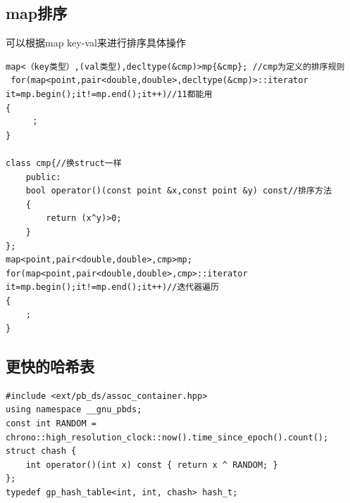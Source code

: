 \documentclass[12pt, a4paper, oneside]{ctexart}
\begin{document}
\newpage 
\subsection{map排序} 
可以根据map key-val来进行排序具体操作
\begin{lstlisting}
map<（key类型）,(val类型),decltype(&cmp)>mp{&cmp}; //cmp为定义的排序规则
 for(map<point,pair<double,double>,decltype(&cmp)>::iterator it=mp.begin();it!=mp.end();it++)//11都能用
{
     ；
}

class cmp{//换struct一样
    public:
    bool operator()(const point &x,const point &y) const//排序方法
    {
        return (x^y)>0;
    }
};
map<point,pair<double,double>,cmp>mp;
for(map<point,pair<double,double>,cmp>::iterator it=mp.begin();it!=mp.end();it++)//迭代器遍历
{   
    ;
}
\end{lstlisting}

\newpage 
\subsection{更快的哈希表} 
\begin{lstlisting}
#include <ext/pb_ds/assoc_container.hpp>
using namespace __gnu_pbds;
const int RANDOM = chrono::high_resolution_clock::now().time_since_epoch().count();
struct chash {
    int operator()(int x) const { return x ^ RANDOM; }
};
typedef gp_hash_table<int, int, chash> hash_t;
\end{lstlisting}
\end{document}
